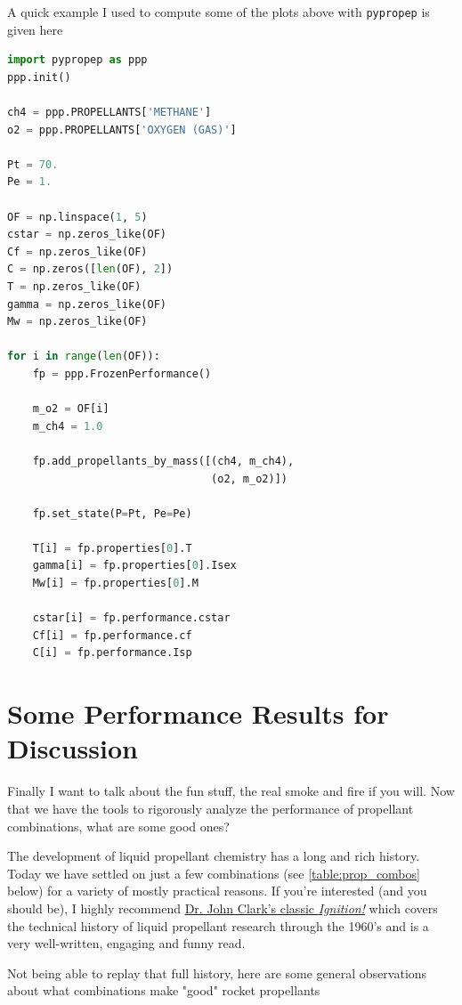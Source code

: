 \documentclass[twocolumn]{memoir} %
\begin{document}
A quick example I used to compute some of the plots above with \texttt{pypropep} is given here

\begin{lstlisting}[language=Python, basicstyle=\small, frame=lines]
import pypropep as ppp
ppp.init()

ch4 = ppp.PROPELLANTS['METHANE']
o2 = ppp.PROPELLANTS['OXYGEN (GAS)']

Pt = 70.
Pe = 1.

OF = np.linspace(1, 5)
cstar = np.zeros_like(OF)
Cf = np.zeros_like(OF)
C = np.zeros([len(OF), 2])
T = np.zeros_like(OF)
gamma = np.zeros_like(OF)
Mw = np.zeros_like(OF)

for i in range(len(OF)):
    fp = ppp.FrozenPerformance()

    m_o2 = OF[i]
    m_ch4 = 1.0

    fp.add_propellants_by_mass([(ch4, m_ch4), 
                                (o2, m_o2)])

    fp.set_state(P=Pt, Pe=Pe)

    T[i] = fp.properties[0].T
    gamma[i] = fp.properties[0].Isex
    Mw[i] = fp.properties[0].M

    cstar[i] = fp.performance.cstar
    Cf[i] = fp.performance.cf
    C[i] = fp.performance.Isp
\end{lstlisting}
\section{Some Performance Results for Discussion}
Finally I want to talk about the fun stuff, the real smoke and fire if you will.  Now that
we have the tools to rigorously analyze the performance of propellant combinations, what
are some good ones?

The development of liquid propellant chemistry has a long and rich history.  Today we have
settled on just a few combinations (see \cref{table:prop_combos} below) for a variety of
mostly practical reasons.  If you're
interested (and you should be), I highly recommend \href{https://library.sciencemadness.org/library/books/ignition.pdf}
{Dr. John Clark's classic \emph{Ignition!}}\cite{ignition}
which covers the technical history of liquid propellant research through the 1960's and 
is a very well-written, engaging and funny read.  

Not being able to replay that full history, here are some general observations about what
combinations make "good" rocket propellants
\end{document}
